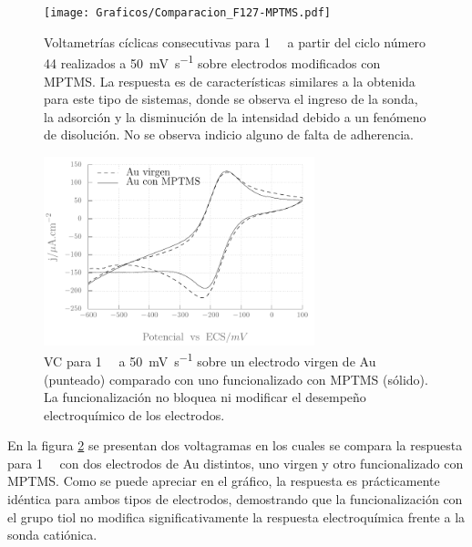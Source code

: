              	\begin{figure}[!ht]
							\begin{center}
				 	   	    \texttt{[image: Graficos/Comparacion\_F127-MPTMS.pdf]}
				       		\caption[Comparación de superficies con y sin MPTMS.]{Voltametrías cíclicas consecutivas para \aminorutenio\space \SI{1}{\milli\Molar} a partir del ciclo número 44 realizados a \SI{50}{\milli\volt.\second^{-1}} sobre electrodos modificados con MPTMS. La respuesta es de características similares a la obtenida para este tipo de sistemas, donde se observa el ingreso de la sonda, la adsorción y la disminución de la intensidad debido a un fenómeno de disolución. No se observa indicio alguno de falta de adherencia.}
						 \label{fig:comparaciones_MPTMS-B}	
					    \end{center}
					    \end{figure}
				
				\begin{figure}[!ht]
							\begin{center}
							\includegraphics[width=0.70\textwidth]{Graficos/Comparacion_Au-MPTMS.pdf}
							\caption[Comparación de electrodos con y sin MPTMS]{VC para \aminorutenio\space \SI{1}{\milli\Molar} a \SI{50}{\milli\volt\per\second} sobre un electrodo virgen de Au (punteado) comparado con uno funcionalizado con MPTMS (sólido). La funcionalización no bloquea ni modificar el desempeño electroquímico de los electrodos.}
							\label{fig:comparaciones_MPTMS-A}
							\end{center}
 							\end{figure}

			 En la figura \ref{fig:comparaciones_MPTMS-A} se presentan dos voltagramas en los cuales se compara la respuesta para \aminorutenio\space \SI{1}{\milli\Molar} con dos electrodos de Au distintos, uno virgen y otro funcionalizado con MPTMS. Como se puede apreciar en el gráfico, la respuesta es prácticamente idéntica para ambos tipos de electrodos, demostrando que la funcionalización con el grupo tiol no modifica significativamente la respuesta electroquímica frente a la sonda catiónica.
        		

